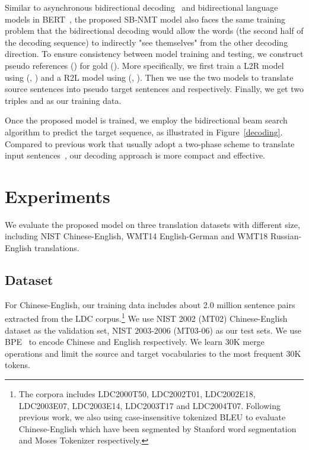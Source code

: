 \documentclass[11pt,a4paper]{article}
\begin{document}
\begin{CJK*}{UTF8}{gbsn}
Similar to asynchronous bidirectional decoding~\cite{zhang2018asynchronous} and bidirectional language models in BERT~\cite{devlin2018bert}, the proposed SB-NMT model also faces the same training problem that the bidirectional decoding would allow the words (the second half of the decoding sequence) to indirectly "see themselves" from the other decoding direction.
To ensure consistency between model training and testing, we construct pseudo references  () for gold  ().
More specifically, we first train a L2R model using (, ) and a R2L model using (, ). Then we use the two models to translate source sentences  into pseudo target sentences  and  respectively.
Finally, we get two triples   and  as our training data.

Once the proposed model is trained, we employ the bidirectional beam search algorithm to predict the target sequence, as illustrated in Figure~\ref{decoding}.
Compared to previous work that usually adopt a two-phase scheme to translate input sentences~\cite{liu2016agreementa,sennrich2017university,zhang2018asynchronous}, our decoding approach is more compact and effective.



\section{Experiments}

We evaluate the proposed model on three translation datasets with different size, including NIST Chinese-English, WMT14 English-German and WMT18 Russian-English translations.


\subsection{Dataset}
For Chinese-English, our training data includes about 2.0 million sentence pairs extracted from the LDC corpus.{\footnote[4]{The corpora includes LDC2000T50, LDC2002T01, LDC2002E18, LDC2003E07, LDC2003E14, LDC2003T17 and LDC2004T07. Following previous work, we also using case-insensitive tokenized BLEU to evaluate Chinese-English which have been segmented by Stanford word segmentation and Moses Tokenizer respectively.}}
 We use NIST 2002 (MT02) Chinese-English dataset as the validation set, NIST 2003-2006 (MT03-06) as our test sets. We use BPE~\cite{Sennrich:2016A} to encode Chinese and English respectively. We learn 30K merge operations and limit the source and target vocabularies to the most frequent 30K tokens.


\end{CJK*}
\end{document}
